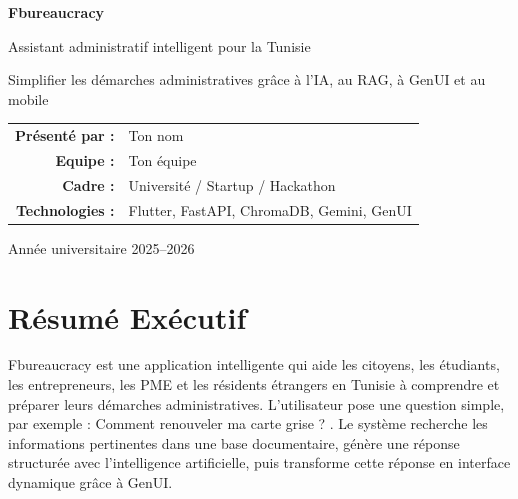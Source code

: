 \documentclass[12pt,a4paper]{report}
\begin{document}

\begin{titlepage}
    \centering
    \vspace*{1.5cm}

    {\Huge\bfseries\color{primary} Fbureaucracy \par}
    \vspace{0.4cm}
    {\Large Assistant administratif intelligent pour la Tunisie \par}

    \vspace{1cm}
    {\large Simplifier les démarches administratives grâce à l'IA, au RAG, à GenUI et au mobile \par}

    \vspace{2cm}

    \begin{tabular}{rl}
        \textbf{Présenté par :} & Ton nom \\
        \textbf{Equipe :} & Ton équipe \\
        \textbf{Cadre :} & Université / Startup / Hackathon \\
        \textbf{Technologies :} & Flutter, FastAPI, ChromaDB, Gemini, GenUI \\
    \end{tabular}

    \vfill
    {\large Année universitaire 2025--2026 \par}
\end{titlepage}

\tableofcontents
\listoffigures
\listoftables
\newpage


\chapter*{Résumé Exécutif}

Fbureaucracy est une application intelligente qui aide les citoyens, les étudiants, les entrepreneurs, les PME et les résidents étrangers en Tunisie à comprendre et préparer leurs démarches administratives. L'utilisateur pose une question simple, par exemple : \og Comment renouveler ma carte grise ? \fg{}. Le système recherche les informations pertinentes dans une base documentaire, génère une réponse structurée avec l'intelligence artificielle, puis transforme cette réponse en interface dynamique grâce à GenUI.
\end{document}
